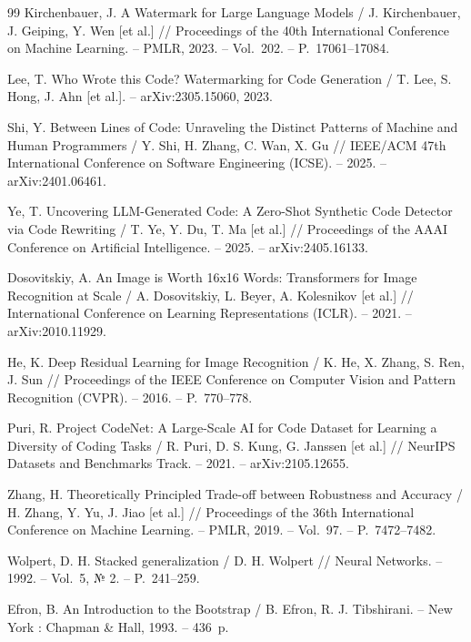 \documentclass{misisarticle}
\begin{document}
\begin{thebibliography}{99}
 Kirchenbauer, J. A Watermark for Large Language Models / J. Kirchenbauer, J. Geiping, Y. Wen [et al.] // Proceedings of the 40th International Conference on Machine Learning. -- PMLR, 2023. -- Vol.~202. -- P.~17061--17084.

 Lee, T. Who Wrote this Code? Watermarking for Code Generation / T. Lee, S. Hong, J. Ahn [et al.]. -- arXiv:2305.15060, 2023.

 Shi, Y. Between Lines of Code: Unraveling the Distinct Patterns of Machine and Human Programmers / Y. Shi, H. Zhang, C. Wan, X. Gu // IEEE/ACM 47th International Conference on Software Engineering (ICSE). -- 2025. -- arXiv:2401.06461.

 Ye, T. Uncovering LLM-Generated Code: A Zero-Shot Synthetic Code Detector via Code Rewriting / T. Ye, Y. Du, T. Ma [et al.] // Proceedings of the AAAI Conference on Artificial Intelligence. -- 2025. -- arXiv:2405.16133.

 Dosovitskiy, A. An Image is Worth 16x16 Words: Transformers for Image Recognition at Scale / A. Dosovitskiy, L. Beyer, A. Kolesnikov [et al.] // International Conference on Learning Representations (ICLR). -- 2021. -- arXiv:2010.11929.

 He, K. Deep Residual Learning for Image Recognition / K. He, X. Zhang, S. Ren, J. Sun // Proceedings of the IEEE Conference on Computer Vision and Pattern Recognition (CVPR). -- 2016. -- P.~770--778.

 Puri, R. Project CodeNet: A Large-Scale AI for Code Dataset for Learning a Diversity of Coding Tasks / R. Puri, D. S. Kung, G. Janssen [et al.] // NeurIPS Datasets and Benchmarks Track. -- 2021. -- arXiv:2105.12655.

 Zhang, H. Theoretically Principled Trade-off between Robustness and Accuracy / H. Zhang, Y. Yu, J. Jiao [et al.] // Proceedings of the 36th International Conference on Machine Learning. -- PMLR, 2019. -- Vol.~97. -- P.~7472--7482.

 Wolpert, D. H. Stacked generalization / D. H. Wolpert // Neural Networks. -- 1992. -- Vol.~5, № 2. -- P.~241--259.

 Efron, B. An Introduction to the Bootstrap / B. Efron, R. J. Tibshirani. -- New York : Chapman \& Hall, 1993. -- 436~p.

\end{thebibliography}
\end{document}
